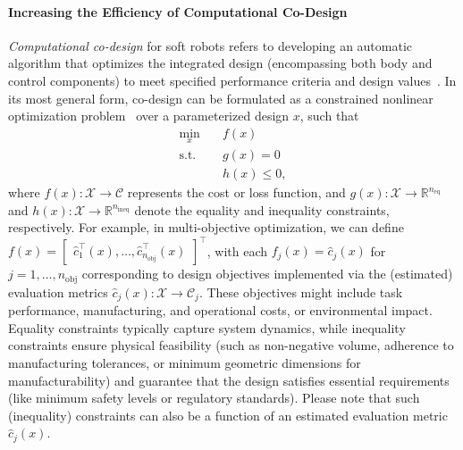 \paragraph{Increasing the Efficiency of Computational Co-Design}
\emph{Computational co-design} for soft robots refers to developing an automatic algorithm that optimizes the integrated design (encompassing both body and control components) to meet specified performance criteria and design values~\citep{carlone2019robot, wang2023softzoo}. In its most general form, co-design can be formulated as a constrained nonlinear optimization problem~\citep{zardini2023co} over a parameterized design $x$, such that
\begin{equation}
\begin{aligned}
    \min_{x} \quad & f(x)\\
    \textrm{s.t.} \quad & g(x) = 0 \\
    & h(x) \leq 0,
\end{aligned}
\end{equation}
where $f(x): \mathcal{X} \to \mathcal{C}$ represents the cost or loss function, and $g(x): \mathcal{X} \to \mathbb{R}^{n_\mathrm{eq}}$ and $h(x): \mathcal{X} \to \mathbb{R}^{n_\mathrm{ineq}}$ denote the equality and inequality constraints, respectively. For example, in multi-objective optimization, we can define $f(x) = \begin{bmatrix} \hat{c}_1^\top(x), \dots, \hat{c}_{n_\mathrm{obj}}^\top(x) \end{bmatrix}^\top$, with each $f_j(x) = \hat{c}_j(x)$ for $j = 1, \dots, n_\mathrm{obj}$ corresponding to design objectives implemented via the (estimated) evaluation metrics $\hat{c}_j(x): \mathcal{X} \to \mathcal{C}_j$. These objectives might include task performance, manufacturing, and operational costs, or environmental impact. Equality constraints typically capture system dynamics, while inequality constraints ensure physical feasibility (such as non-negative volume, adherence to manufacturing tolerances, or minimum geometric dimensions for manufacturability) and guarantee that the design satisfies essential requirements (like minimum safety levels or regulatory standards). Please note that such (inequality) constraints can also be a function of an estimated evaluation metric $\hat{c}_j(x)$.

